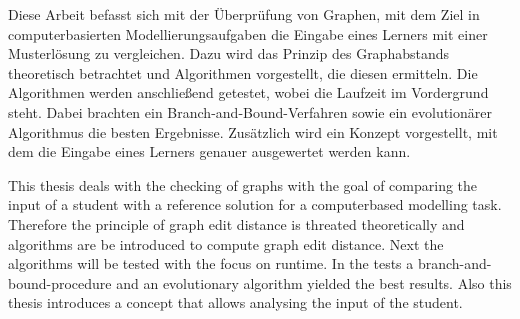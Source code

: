 \begin{abstractFrame}
\begin{deAbstract}
Diese Arbeit befasst sich mit der Überprüfung von Graphen, mit dem Ziel in 
computerbasierten Modellierungsaufgaben die Eingabe eines Lerners mit einer 
Musterlösung zu vergleichen. 
Dazu wird das Prinzip des Graphabstands theoretisch betrachtet 
und Algorithmen vorgestellt, die diesen ermitteln. Die Algorithmen werden anschließend 
getestet, wobei die Laufzeit im Vordergrund steht. Dabei brachten ein 
Branch-and-Bound-Verfahren sowie ein evolutionärer Algorithmus die besten Ergebnisse.
 Zusätzlich wird ein Konzept 
vorgestellt, mit dem die Eingabe eines Lerners genauer ausgewertet werden kann.
\end{deAbstract}


\begin{enAbstract}
This thesis deals with the checking of graphs with the goal of comparing the input of 
a student with a reference solution for a computerbased modelling task. Therefore the 
principle of graph edit distance 
is threated theoretically and algorithms are be introduced to compute graph edit 
distance. Next the algorithms will be tested with the focus on runtime. In the tests a 
branch-and-bound-procedure and an evolutionary algorithm yielded the best results. Also this 
thesis introduces a concept that allows analysing the input of the student.
\end{enAbstract}

\end{abstractFrame}
